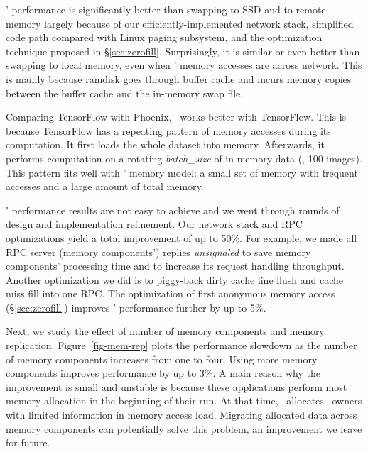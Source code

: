 \documentclass[10pt,times,twocolumn]{z2-article}
\begin{document}
{{{{{{{\lego{}' performance is significantly better than swapping to SSD and to remote memory 
largely because of our efficiently-implemented network stack, simplified code path compared with Linux paging subsystem,
and the optimization technique proposed in \S\ref{sec:zerofill}.
Surprisingly, it is similar or even better than swapping to local memory, even when \lego{}' memory accesses are across network.
This is mainly because ramdisk goes through buffer cache and incurs memory copies between the buffer cache and the in-memory swap file.

Comparing TensorFlow with Phoenix, \lego\ works better with TensorFlow.
This is because TensorFlow has a repeating pattern of memory accesses during its computation.
It first loads the whole dataset into memory. 
Afterwards, it performs computation on a rotating {\em batch\_size} of in-memory data (\eg, 100 images).
This pattern fits well with \lego{}' memory model: a small set of memory with frequent accesses and a large amount of total memory.
\fi

\lego{}' performance results are not easy to achieve and we went through rounds of design and implementation refinement.
Our network stack and RPC optimizations yield a total improvement of up to 50\%.
For example, we made all RPC server (memory components') replies {\em unsignaled} to save memory components' processing time
and to increase its request handling throughput.
Another optimization we did is to piggy-back dirty cache line flush and cache miss fill into one RPC.
The optimization of first anonymous memory access (\S\ref{sec:zerofill}) improves \lego{}' performance further by up to 5\%.


%
Next, we study the effect of number of memory components and memory replication.
Figure~\ref{fig-mem-rep} plots the performance slowdown as the number of memory components increases from one to four.
Using more memory components improves performance by up to 3\%.
A main reason why the improvement is small and unstable is because these applications perform
most memory allocation in the beginning of their run.
At that time, \lego\ allocates \vregion\ owners with limited information in memory access load.
Migrating allocated data across memory components can potentially solve this problem,
an improvement we leave for future.

}}}}}}}
\end{document}
